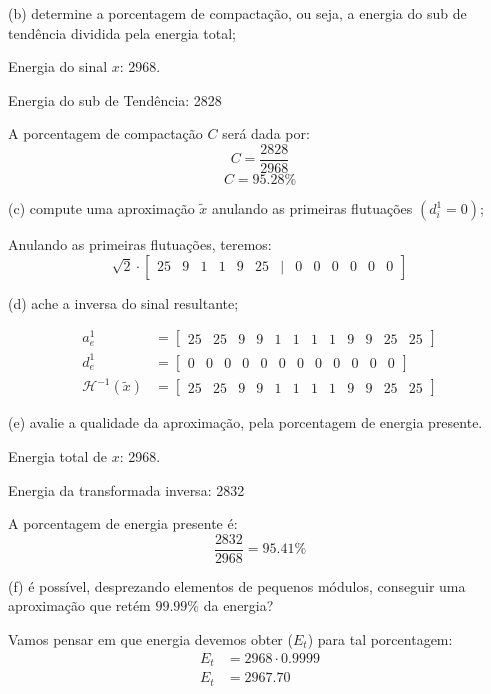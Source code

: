 \documentclass[10pt]{article}
\newcommand{\Hi}[1]{\mathcal{H}^{-1}\left(#1\right)}
\begin{document}
\vspace{1em}

(b) determine a porcentagem de compactação, ou seja, a energia do sub de tendência dividida pela energia total;

Energia do sinal $x$: 2968.

Energia do sub de Tendência: 2828

A porcentagem de compactação $C$ será dada por:
\[C = \frac{2828}{2968}\]
\[\boxed{C = 95.28\%}\]

(c) compute uma aproximação $\tilde{x}$ anulando as primeiras flutuações $(d_i^1 = 0)$;

Anulando as primeiras flutuações, teremos:
\[\sqrt{2} \cdot \begin{bmatrix}
    25 & 9 & 1 & 1 & 9 & 25 & \mid & 0 & 0 & 0 & 0 & 0 & 0
\end{bmatrix}\]

(d) ache a inversa do sinal resultante;

\begin{align*}
    a_e^1 &= \begin{bmatrix}
        25 & 25 & 9 & 9 & 1 & 1 & 1 & 1 & 9 & 9 & 25 & 25
    \end{bmatrix}\\
    d_e^1 &= \begin{bmatrix}
        0 & 0 & 0 & 0 & 0 & 0 & 0 & 0 & 0 & 0 & 0 & 0
    \end{bmatrix}\\
    \Hi{\tilde{x}} &= \begin{bmatrix}
        25 & 25 & 9 & 9 & 1 & 1 & 1 & 1 & 9 & 9 & 25 & 25
    \end{bmatrix}
\end{align*}

(e) avalie a qualidade da aproximação, pela porcentagem de energia presente.

Energia total de $x$: 2968.

Energia da transformada inversa: 2832

A porcentagem de energia presente é:
\[\frac{2832}{2968} = \boxed{95.41\%}\]

(f) é possível, desprezando elementos de pequenos módulos, conseguir uma aproximação que retém $99.99\%$ da energia?

Vamos pensar em que energia devemos obter ($E_t$) para tal porcentagem:
\begin{align*}
    E_t &= 2968 \cdot 0.9999\\
    E_t &= 2967.70
\end{align*}
\end{document}
